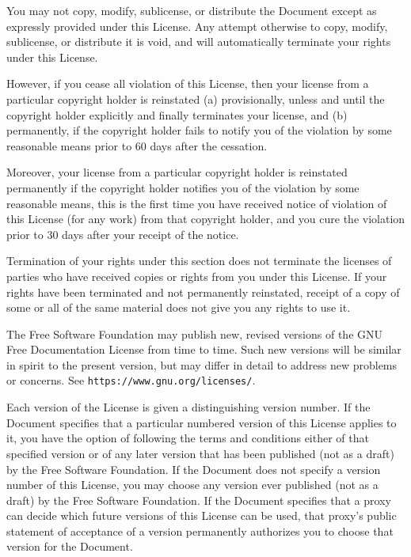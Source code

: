 You may not copy, modify, sublicense, or distribute the Document
except as expressly provided under this License.  Any attempt
otherwise to copy, modify, sublicense, or distribute it is void, and
will automatically terminate your rights under this License.

However, if you cease all violation of this License, then your license
from a particular copyright holder is reinstated (a) provisionally,
unless and until the copyright holder explicitly and finally
terminates your license, and (b) permanently, if the copyright holder
fails to notify you of the violation by some reasonable means prior to
60 days after the cessation.

Moreover, your license from a particular copyright holder is
reinstated permanently if the copyright holder notifies you of the
violation by some reasonable means, this is the first time you have
received notice of violation of this License (for any work) from that
copyright holder, and you cure the violation prior to 30 days after
your receipt of the notice.

Termination of your rights under this section does not terminate the
licenses of parties who have received copies or rights from you under
this License.  If your rights have been terminated and not permanently
reinstated, receipt of a copy of some or all of the same material does
not give you any rights to use it.


\stopalignment


The Free Software Foundation may publish new, revised versions
of the GNU Free Documentation License from time to time.  Such new
versions will be similar in spirit to the present version, but may
differ in detail to address new problems or concerns.  See
{\tt https://www.gnu.org/licenses/}.

Each version of the License is given a distinguishing version number.
If the Document specifies that a particular numbered version of this
License  applies to it, you have the option of
following the terms and conditions either of that specified version or
of any later version that has been published (not as a draft) by the
Free Software Foundation.  If the Document does not specify a version
number of this License, you may choose any version ever published (not
as a draft) by the Free Software Foundation.  If the Document
specifies that a proxy can decide which future versions of this
License can be used, that proxy's public statement of acceptance of a
version permanently authorizes you to choose that version for the
Document.


